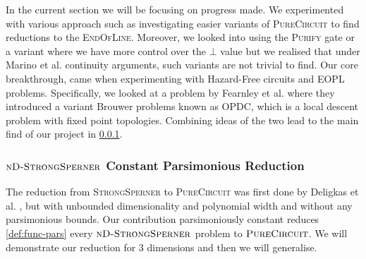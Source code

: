 In the current section we will be focusing on progress made.
We experimented with various approach
such as investigating easier variants of \textsc{PureCircuit} to find reductions
to the \textsc{EndOfLine}. Moreover, we looked into using the \textsc{Purify} gate
or a variant where we have more control over the $\bot$ value but we
realised that under Marino et al. \cite{marino_GeneralTheoryMetastable_1981} continuity
arguments, such variants are not trivial to find.
Our core breakthrough, came when experimenting with
Hazard-Free circuits  and \textsc{EOPL} problems. Specifically,
we looked at a problem by Fearnley et al. \cite{fearnley_UniqueEndPotential_2020} where
they introduced a variant Brouwer problems known as \textsc{OPDC}, which is a 
local descent problem with fixed point topologies. Combining ideas of the two 
lead to the main find of our project in \ref{sect:main-result}.






\subsubsection{$\textnormal{\textsc{nD-StrongSperner}}$ Constant Parsimonious Reduction} \label{sect:main-result}

The reduction from \textsc{StrongSperner} to \textsc{PureCircuit} was first
done by Deligkas et al. \cite{deligkas_PureCircuitTightInapproximability_2024},
but with unbounded dimensionality and polynomial width and without any parsimonious bounds.
Our contribution parsimoniously constant reduces \ref{def:func-pars}
every $\textnormal{\textsc{nD-StrongSperner}}$ problem to  $\textnormal{\textsc{PureCircuit}}$. 
We will demonstrate our reduction for 3 dimensions and then we will generalise.

